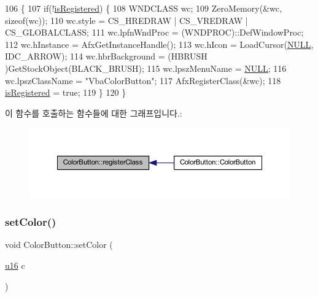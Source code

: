 \begin{DoxyCode}
106 \{
107   \textcolor{keywordflow}{if}(!\mbox{\hyperlink{class_color_button_a77e2fa25affb19cac1c18594d5bc478f}{isRegistered}}) \{
108     WNDCLASS wc;
109     ZeroMemory(&wc, \textcolor{keyword}{sizeof}(wc));
110     wc.style = CS\_HREDRAW | CS\_VREDRAW | CS\_GLOBALCLASS;
111     wc.lpfnWndProc = (WNDPROC)::DefWindowProc;
112     wc.hInstance = AfxGetInstanceHandle();
113     wc.hIcon = LoadCursor(\mbox{\hyperlink{getopt1_8c_a070d2ce7b6bb7e5c05602aa8c308d0c4}{NULL}}, IDC\_ARROW);
114     wc.hbrBackground = (HBRUSH )GetStockObject(BLACK\_BRUSH);
115     wc.lpszMenuName = \mbox{\hyperlink{getopt1_8c_a070d2ce7b6bb7e5c05602aa8c308d0c4}{NULL}};
116     wc.lpszClassName = \textcolor{stringliteral}{"VbaColorButton"};
117     AfxRegisterClass(&wc);
118     \mbox{\hyperlink{class_color_button_a77e2fa25affb19cac1c18594d5bc478f}{isRegistered}} = \textcolor{keyword}{true};
119   \}
120 \}
\end{DoxyCode}
이 함수를 호출하는 함수들에 대한 그래프입니다.\+:
\nopagebreak
\begin{figure}[H]
\begin{center}
\leavevmode
\includegraphics[width=350pt]{class_color_button_aabbc7306d4354479e0315b2a15026571_icgraph}
\end{center}
\end{figure}
\mbox{\label{class_color_button_a9ff5dc144a4acd5e2551ab94506b3bb0}} 
\subsubsection{\texorpdfstring{set\+Color()}{setColor()}}
{\footnotesize\ttfamily void Color\+Button\+::set\+Color (\begin{DoxyParamCaption}\item[{\mbox{\hyperlink{_system_8h_a9e6c91d77e24643b888dbd1a1a590054}{u16}}}]{c }\end{DoxyParamCaption})}



